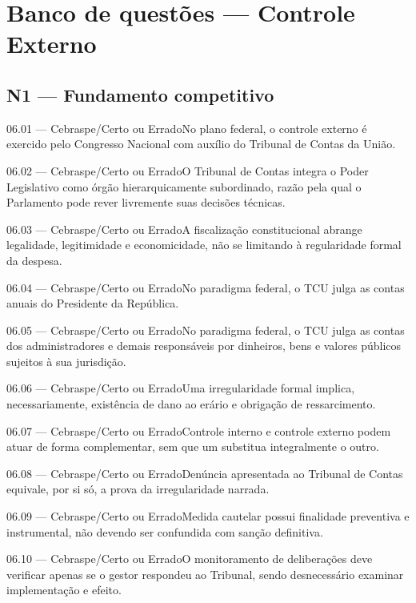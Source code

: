 \section{Banco de questões — Controle Externo}

\subsection*{N1 — Fundamento competitivo}
\begin{questao}{ 06.01 — Cebraspe/Certo ou Errado}No plano federal, o controle externo é exercido pelo Congresso Nacional com auxílio do Tribunal de Contas da União.\end{questao}
\begin{questao}{ 06.02 — Cebraspe/Certo ou Errado}O Tribunal de Contas integra o Poder Legislativo como órgão hierarquicamente subordinado, razão pela qual o Parlamento pode rever livremente suas decisões técnicas.\end{questao}
\begin{questao}{ 06.03 — Cebraspe/Certo ou Errado}A fiscalização constitucional abrange legalidade, legitimidade e economicidade, não se limitando à regularidade formal da despesa.\end{questao}
\begin{questao}{ 06.04 — Cebraspe/Certo ou Errado}No paradigma federal, o TCU julga as contas anuais do Presidente da República.\end{questao}
\begin{questao}{ 06.05 — Cebraspe/Certo ou Errado}No paradigma federal, o TCU julga as contas dos administradores e demais responsáveis por dinheiros, bens e valores públicos sujeitos à sua jurisdição.\end{questao}
\begin{questao}{ 06.06 — Cebraspe/Certo ou Errado}Uma irregularidade formal implica, necessariamente, existência de dano ao erário e obrigação de ressarcimento.\end{questao}
\begin{questao}{ 06.07 — Cebraspe/Certo ou Errado}Controle interno e controle externo podem atuar de forma complementar, sem que um substitua integralmente o outro.\end{questao}
\begin{questao}{ 06.08 — Cebraspe/Certo ou Errado}Denúncia apresentada ao Tribunal de Contas equivale, por si só, a prova da irregularidade narrada.\end{questao}
\begin{questao}{ 06.09 — Cebraspe/Certo ou Errado}Medida cautelar possui finalidade preventiva e instrumental, não devendo ser confundida com sanção definitiva.\end{questao}
\begin{questao}{ 06.10 — Cebraspe/Certo ou Errado}O monitoramento de deliberações deve verificar apenas se o gestor respondeu ao Tribunal, sendo desnecessário examinar implementação e efeito.\end{questao}

